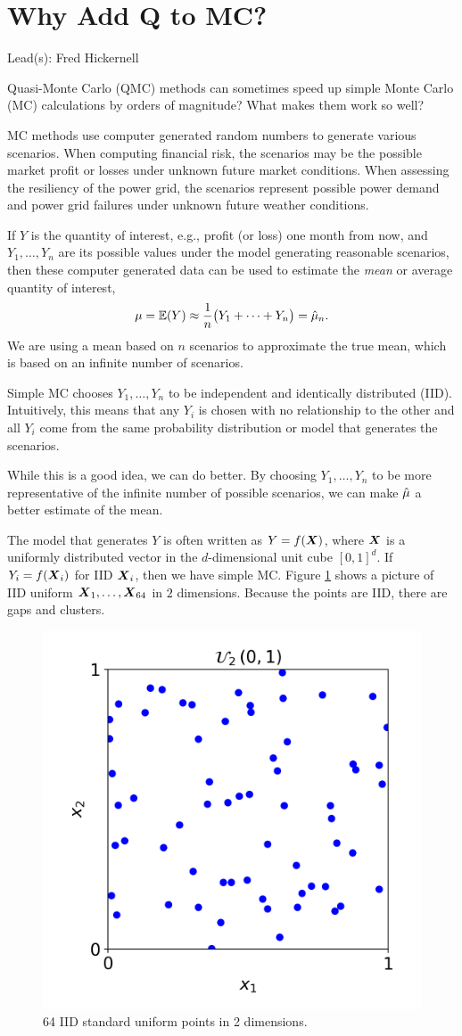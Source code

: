 \documentclass{article}
\newcommand{\blogpost}[3]{\newpage%
\section{#1}%
\begin{refsection}%
	Lead(s): #2 \bigskip #3%
\printbibliography[heading=subbibliography]
\end{refsection}
} %
\begin{document}
\blogpost{Why Add Q to MC?}{Fred Hickernell}{\label{WhyQ}

Quasi-Monte Carlo (QMC) methods can sometimes speed up simple Monte Carlo (MC) calculations by orders of magnitude?  What makes them work so well?

MC methods use computer generated random numbers to generate various scenarios.  When computing financial risk, the scenarios may be the possible market profit or losses under unknown future market conditions.  When assessing the resiliency of the power grid, the scenarios represent possible power demand and power grid failures under unknown future weather conditions.

If $Y$ is the quantity of interest, e.g., profit (or loss) one month from now, and $Y_1, \ldots, Y_n$ are its possible values under the model generating reasonable scenarios, then these computer generated data can be used to estimate the \emph{mean} or average quantity of interest, 
\[
\mu = \operatorname{\mathbb{E}}(Y) \approx \frac 1n \bigl ( Y_1 + \cdots + Y_n \bigr) = \hat{\mu}_n.
\]
We are using a mean based on $n$ scenarios to approximate the true mean, which is based on an infinite number of scenarios.

Simple MC chooses $Y_1, \ldots, Y_n$ to be independent and identically distributed (IID).  Intuitively, this means that any $Y_i$ is chosen with no relationship to the other and all $Y_i$ come from the same probability distribution or model that generates the scenarios.

While this is a good idea, we can do better.  By choosing $Y_1, \ldots, Y_n$ to be more representative of the infinite number of possible scenarios, we can make $\hat{\mu}$ a better estimate of the mean.

The model that generates $Y$ is often written as $Y= f(\boldsymbol{X})$, where $\boldsymbol{X}$ is a uniformly distributed vector in the $d$-dimensional unit cube $[0,1]^d$.  If $Y_i = f(\boldsymbol{X}_i)$ for IID $\boldsymbol{X}_i$, then we have simple MC.  Figure \ref{fig:iid_pts} shows a picture of IID uniform  $\boldsymbol{X}_1, \ldots, \boldsymbol{X}_{64}$ in $2$ dimensions.  Because the points are IID, there are gaps and clusters.

\begin{figure}[ht!]
    \centering
    \includegraphics[width=.6\textwidth]{figures/iid_uniform_pts.png}
    \caption{64 IID standard uniform points in 2 dimensions.}
    \label{fig:iid_pts}
\end{figure}

}
\end{document}
